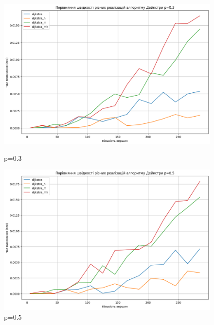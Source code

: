 \documentclass[a4paper,12pt]{article}
\begin{document}
\begin{figure}[ht]
    \centering
    \begin{minipage}{0.45\textwidth}
        \centering
        \includegraphics[width=\textwidth]{img/alldijkstra03.png}
        \caption{p=0.3}
        \label{fig:alldijkstra03}
    \end{minipage}
    \hfill
    \begin{minipage}{0.45\textwidth}
        \centering
        \includegraphics[width=\textwidth]{img/alldijkstra05.png}
        \caption{p=0.5}
        \label{fig:alldijkstra05}
    \end{minipage}
    

\end{figure}
\end{document}
